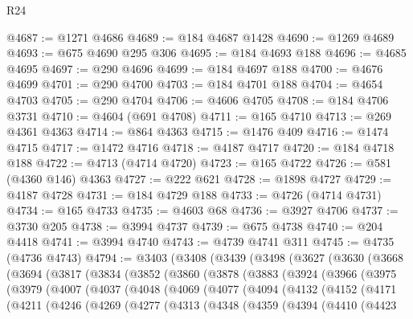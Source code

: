 \begin{lexlean}{R24}
\begin{coremodule}
@4687 := @1271 @4686
@4689 := @184 @4687 @1428
@4690 := @1269 @4689
@4693 := @675 @4690 @295 @306
@4695 := @184 @4693 @188
@4696 := @4685 @4695
@4697 := @290 @4696
@4699 := @184 @4697 @188
@4700 := @4676 @4699
@4701 := @290 @4700
@4703 := @184 @4701 @188
@4704 := @4654 @4703
@4705 := @290 @4704
@4706 := @4606 @4705
@4708 := @184 @4706 @3731
@4710 := @4604 (@691 @4708)
@4711 := @165 @4710
@4713 := @269 @4361 @4363
@4714 := @864 @4363
@4715 := @1476 @409
@4716 := @1474 @4715
@4717 := @1472 @4716
@4718 := @4187 @4717
@4720 := @184 @4718 @188
@4722 := @4713 (@4714 @4720)
@4723 := @165 @4722
@4726 := @581 (@4360 @146) @4363
@4727 := @222 @621
@4728 := @1898 @4727
@4729 := @4187 @4728
@4731 := @184 @4729 @188
@4733 := @4726 (@4714 @4731)
@4734 := @165 @4733
@4735 := @4603 @68
@4736 := @3927 @4706
@4737 := @3730 @205
@4738 := @3994 @4737
@4739 := @675 @4738
@4740 := @204 @4418
@4741 := @3994 @4740
@4743 := @4739 @4741 @311
@4745 := @4735 (@4736 @4743)
@4794 := @3403
    (@3408
      (@3439
        (@3498
          (@3627
            (@3630
              (@3668
                (@3694
                  (@3817
                    (@3834
                      (@3852
                        (@3860
                          (@3878
                            (@3883
                              (@3924
                                (@3966
                                  (@3975
                                    (@3979
                                      (@4007
                                        (@4037
                                          (@4048
                                            (@4069
                                              (@4077
                                                (@4094
                                                  (@4132
                                                    (@4152
                                                      (@4171
                                                        (@4211
                                                          (@4246
                                                            (@4269
                                                              (@4277
                                                                (@4313
                                                                  (@4348
                                                                    (@4359
                                                                      (@4394
                                                                        (@4410
                                                                          (@4423

\end{coremodule}
\end{lexlean}
